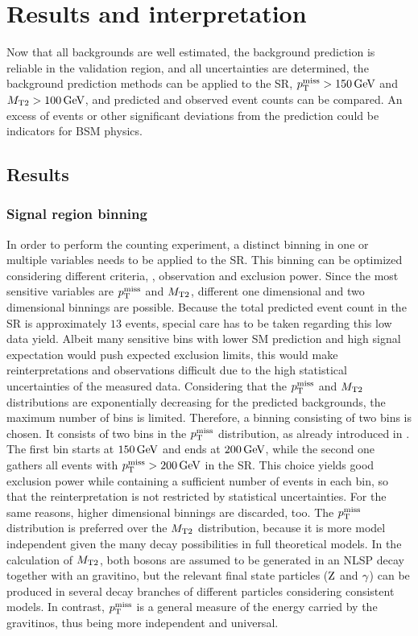 \chapter{Results and interpretation}\label{chap:results}
\minitoc
Now that all backgrounds are well estimated, the background prediction is reliable in the validation region, and all uncertainties are determined, the background prediction methods can be applied to the SR, $p_{\mathrm{T}}^\text{miss}>150\,\text{Ge\hspace{-.08em}V}$ and $M_{\mathrm{T2}}>100\,\text{Ge\hspace{-.08em}V}$, and predicted and observed event counts can be compared. An excess of events or other significant deviations from the prediction could be indicators for BSM physics.
\section{Results}\label{sec:results}
\subsection*{Signal region binning}
In order to perform the counting experiment, a distinct binning in one or multiple variables needs to be applied to the SR. This binning can be optimized considering different criteria, \eg, observation and exclusion power. Since the most sensitive variables are $p_{\mathrm{T}}^\text{miss}$ and $M_{\mathrm{T2}}$, different one dimensional and two dimensional binnings are possible.
Because the total predicted event count in the SR is approximately $13$ events, special care has to be taken regarding this low data yield. Albeit many sensitive bins with lower SM prediction and high signal expectation would push expected exclusion limits, this would make reinterpretations and observations difficult due to the high statistical uncertainties of the measured data. Considering that the $p_{\mathrm{T}}^\text{miss}$ and $M_{\mathrm{T2}}$ distributions are exponentially decreasing for the predicted backgrounds, the maximum number of bins is limited. Therefore, a binning consisting of two bins is chosen. It consists of two bins in the $p_{\mathrm{T}}^\text{miss}$ distribution, as already introduced in . The first bin starts at $150\,\text{Ge\hspace{-.08em}V}$ and ends at $200\,\text{Ge\hspace{-.08em}V}$, while the second one gathers all events with $p_{\mathrm{T}}^\text{miss}>200\,\text{Ge\hspace{-.08em}V}$ in the SR. This choice yields good exclusion power while containing a sufficient number of events in each bin, so that the reinterpretation is not restricted by statistical uncertainties. For the same reasons, higher dimensional binnings are discarded, too. The $p_{\mathrm{T}}^\text{miss}$ distribution is preferred over the $M_{\mathrm{T2}}$ distribution, because it is more model independent given the many decay possibilities in full theoretical models. In the calculation of $M_{\mathrm{T2}}$, both bosons are assumed to be generated in an NLSP decay together with an gravitino, but the relevant final state particles ($\mathrm{Z}$ and $\gamma$) can be produced in several decay branches of different particles considering consistent models. In contrast, $p_{\mathrm{T}}^\text{miss}$ is a general measure of the energy carried by the gravitinos, thus being more independent and universal.
